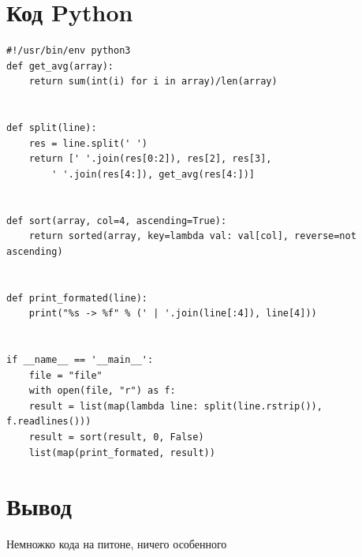 \documentclass[11pt]{article}
\begin{document}
\section{Код Python}
\label{sec:org72fd0fa}
\scriptsize
\lstset{language=Python,label= ,caption= ,captionpos=b,numbers=none}
\begin{lstlisting}
#!/usr/bin/env python3
def get_avg(array):
    return sum(int(i) for i in array)/len(array)


def split(line):
    res = line.split(' ')
    return [' '.join(res[0:2]), res[2], res[3],
	    ' '.join(res[4:]), get_avg(res[4:])]


def sort(array, col=4, ascending=True):
    return sorted(array, key=lambda val: val[col], reverse=not ascending)


def print_formated(line):
    print("%s -> %f" % (' | '.join(line[:4]), line[4]))


if __name__ == '__main__':
    file = "file"
    with open(file, "r") as f:
	result = list(map(lambda line: split(line.rstrip()), f.readlines()))
    result = sort(result, 0, False)
    list(map(print_formated, result))
\end{lstlisting}

\section{Вывод}
\label{sec:orgafd301a}
\normalsize
Немножко кода на питоне, ничего особенного
\end{document}
